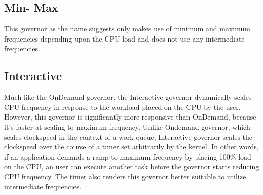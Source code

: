 \subsection{Min- Max}
This governor as the name suggests only makes use of minimum and maximum frequencies depending upon the CPU load and does not use any intermediate frequencies.

\subsection{Interactive}
Much like the OnDemand governor, the Interactive governor dynamically scales CPU frequency in response to the workload placed on the CPU by the user. However, this governor is significantly more responsive than OnDemand, because it's faster at scaling to maximum frequency.
Unlike Ondemand governor, which scales clockspeed in the context of a work queue, Interactive governor scales the clockspeed over the course of a timer set arbitrarily by the kernel. In other words, if an application demands a ramp to maximum frequency by placing 100\% load on the CPU, an user can execute another task before the governor starts reducing CPU frequency. The timer also renders this governor better suitable to utilize intermediate frequencies.

